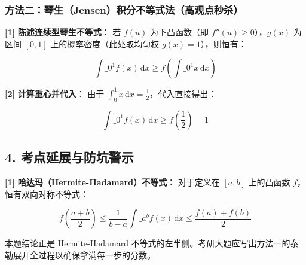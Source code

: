 \documentclass[11pt,a4paper,UTF8]{ctexart}
\begin{document}
\subsubsection{方法二：琴生（Jensen）积分不等式法（高观点秒杀）}
\begin{solbox}[分步推导与答题规范]
\textbf{[1]}  \textbf{陈述连续型琴生不等式}：
若 $f(u)$ 为下凸函数（即 $f''(u) \ge 0$），$g(x)$ 为区间 $[0, 1]$ 上的概率密度（此处取均匀权 $g(x) = 1$），则恒有：

\begin{equation*}
\int\_0^1 f(x)\,\mathrm{d}x \ge f\left( \int\_0^1 x\,\mathrm{d}x \right)
\end{equation*}


\textbf{[2]}  \textbf{计算重心并代入}：
由于 $\int_0^1 x\,\mathrm{d}x = \frac{1}{2}$，代入直接得出：

\begin{equation*}
\int\_0^1 f(x)\,\mathrm{d}x \ge f\left(\frac{1}{2}\right) = 1
\end{equation*}

\end{solbox}


\subsection{4. 考点延展与防坑警示}
\begin{solbox}[分步推导与答题规范]
\textbf{[1]}  \textbf{哈达玛（Hermite-Hadamard）不等式}：
对于定义在 $[a, b]$ 上的凸函数 $f$，恒有双向对称不等式：

\begin{equation*}
f\left(\frac{a+b}{2}\right) \le \frac{1}{b-a}\int\_a^b f(x)\,\mathrm{d}x \le \frac{f(a)+f(b)}{2}
\end{equation*}

本题结论正是 Hermite-Hadamard 不等式的左半侧。考研大题应写出方法一的泰勒展开全过程以确保拿满每一步的分数。
\end{solbox}
\end{document}
